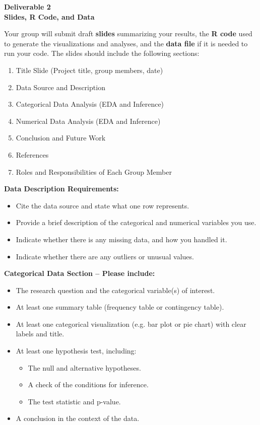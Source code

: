 \documentclass[12pt]{article}
\begin{document}
\begin{center}
\textbf{\Large Deliverable 2 \\ Slides, R Code, and Data}
\end{center}

Your group will submit draft \textbf{slides} summarizing your results, the \textbf{R code} used to generate the visualizations and analyses, and the \textbf{data file} if it is needed to run your code.
The slides should include the following sections:

\begin{enumerate}
    \item Title Slide (Project title, group members, date)
    \item Data Source and Description
    \item Categorical Data Analysis (EDA and Inference)
    \item Numerical Data Analysis (EDA and Inference)
    \item Conclusion and Future Work
    \item References
    \item Roles and Responsibilities of Each Group Member
\end{enumerate}

\vspace{6pt}
\noindent \textbf{Data Description Requirements:}
\begin{itemize}
    \item Cite the data source and state what one row represents.
    \item Provide a brief description of the categorical and numerical variables you use.
    \item Indicate whether there is any missing data, and how you handled it.
    \item Indicate whether there are any outliers or unusual values.
\end{itemize}

\vspace{6pt}
\noindent \textbf{Categorical Data Section -- Please include:}
\begin{itemize}
    \item The research question and the categorical variable(s) of interest.
    \item At least one summary table (frequency table or contingency table).
    \item At least one categorical visualization (e.g. bar plot or pie chart) with clear labels and title.
    \item At least one hypothesis test, including:
    \begin{itemize}
        \item The null and alternative hypotheses.
        \item A check of the conditions for inference.
        \item The test statistic and p-value.
    \end{itemize}
    \item A conclusion in the context of the data.
\end{itemize}
\end{document}
